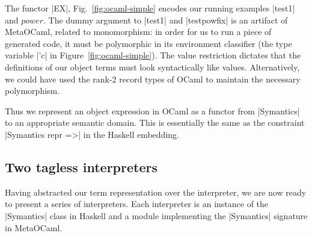 The functor |EX|, Fig.~\ref{fig:ocaml-simple} encodes 
our running examples |test1| and $\mathit{power}$.
The dummy argument to |test1| and |testpowfix| is an artifact of
MetaOCaml, related to monomorphism: in order for us to run a
piece of generated code, it must be polymorphic in its environment
classifier (the type variable |'c| in Figure~\ref{fig:ocaml-simple}).
The value restriction dictates that
the definitions of our object terms must look syntactically like
values. Alternatively, we could have used
the rank-2 record types of OCaml to maintain the necessary polymorphism.

Thus we represent an object expression in
OCaml as a functor from |Symantics| to an appropriate semantic domain. This
is essentially the same as the constraint |Symantics repr =>| in the
Haskell embedding.

\subsection{Two tagless interpreters}
\label{S:interpreter-RL}

Having abstracted our term representation over the interpreter, we are
now ready to present a series of interpreters.  Each interpreter is an
instance of the |Symantics| class in Haskell and a module implementing
the |Symantics| signature in MetaOCaml.

